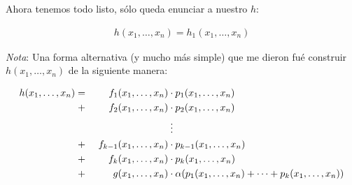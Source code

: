 \documentclass[fleqn, 11pt]{article}
\begin{document}
Ahora tenemos todo listo, sólo queda enunciar a nuestro $h$:

\begin{align*}
	h(x_1, \dots, x_n) = h_1(x_1, \dots, x_n)
\end{align*}

\emph{Nota}: Una forma alternativa (y mucho más simple) que me dieron fué
construir \\ $h(x_1, \dots, x_n)$ de la siguiente manera:

\begin{alignat*}{3}
	h(x_1, \dots, x_n)
	=&& f_1(x_1, \dots, x_n) &\cdot p_1(x_1, \dots, x_n) \\
	+&& f_2(x_1, \dots, x_n) &\cdot p_2(x_1, \dots, x_n) \\
	&&&\vdotswithin{\cdot} \\
	+&& \ f_{k-1}(x_1, \dots, x_n) &\cdot p_{k-1}(x_1, \dots, x_n) \\
	+&& f_k(x_1, \dots, x_n) &\cdot p_k(x_1, \dots, x_n) \\
	+&& g(x_1, \dots, x_n)
	&\cdot \alpha(p_1(x_1, \dots, x_n) + \cdots + p_k(x_1, \dots, x_n))
\end{alignat*}
\end{document}
